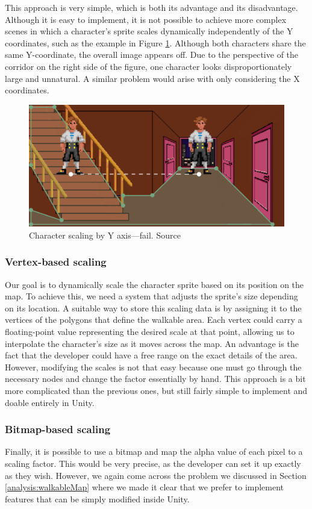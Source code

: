 This approach is very simple, which is both its advantage and its disadvantage. Although it is easy to implement, it is not possible to achieve more complex scenes in which a character's sprite scales dynamically independently of the Y coordinates, such as the example in Figure \ref{fig:ScaleF}. Although both characters share the same Y-coordinate, the overall image appears off. Due to the perspective of the corridor on the right side of the figure, one character looks disproportionately large and unnatural.  A similar problem would arise with only considering the X coordinates.

\begin{figure}[H]
\centering
\includegraphics[width=.7\linewidth]{img/scalef-y.png}
\caption{Character scaling by Y axis—fail. Source \cite{Uurloon3}}
\label{fig:ScaleF}
\end{figure}

\subsubsection{Vertex-based scaling}
Our goal is to dynamically scale the character sprite based on its position on the map. To achieve this, we need a system that adjusts the sprite’s size depending on its location. A suitable way to store this scaling data is by assigning it to the vertices of the polygons that define the walkable area. Each vertex could carry a floating-point value representing the desired scale at that point, allowing us to interpolate the character's size as it moves across the map.  An advantage is the fact that the developer could have a free range on the exact details of the area. However, modifying the scales is not that easy because one must go through the necessary nodes and change the factor essentially by hand. This approach is a bit more complicated than the previous ones, but still fairly simple to implement and doable entirely in Unity.

\subsubsection{Bitmap-based scaling}
Finally, it is possible to use a bitmap and map the alpha value of each pixel to a scaling factor. This would be very precise, as the developer can set it up exactly as they wish. However, we again come across the problem we discussed in Section \ref{analysis:walkableMap} where we made it clear that we prefer to implement features that can be simply modified inside Unity.

